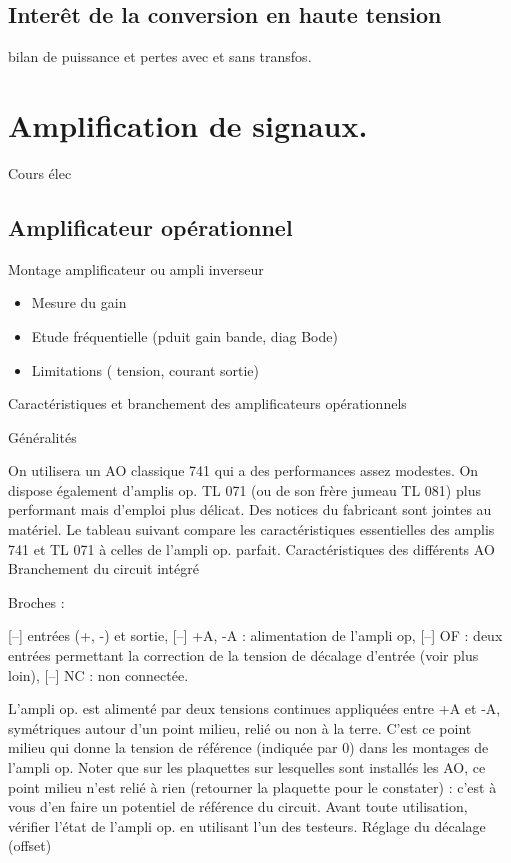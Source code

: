 \documentclass{article}%
\begin{document}
\subsection{Interêt de la conversion en haute tension}
bilan de puissance et pertes avec et sans transfos.

\section{Amplification de signaux.}

Cours élec

\subsection{Amplificateur opérationnel}
Montage amplificateur ou ampli inverseur

\begin{itemize}
\item Mesure du gain
\item Etude fréquentielle (pduit gain bande, diag Bode)
\item Limitations ( tension, courant sortie)
\end{itemize}

 Caractéristiques et branchement des amplificateurs opérationnels

 Généralités

On utilisera un AO classique 741 qui a des performances assez modestes. On dispose également d'amplis op. TL 071 (ou de son frère jumeau TL 081) plus performant mais d'emploi plus délicat. Des notices du fabricant sont jointes au matériel. Le tableau suivant compare les caractéristiques essentielles des amplis 741 et TL 071 à celles de l'ampli op. parfait.
Caractéristiques des différents AO
Branchement du circuit intégré

Broches :

    [--] entrées (+, -) et sortie,
    [--] +A, -A : alimentation de l'ampli op,
    [--] OF : deux entrées permettant la correction de la tension de décalage d'entrée (voir plus loin),
    [--] NC : non connectée.

L'ampli op. est alimenté par deux tensions continues appliquées entre +A et -A, symétriques autour d'un point milieu, relié ou non à la terre. C'est ce point milieu qui donne la tension de référence (indiquée par 0) dans les montages de l'ampli op. Noter que sur les plaquettes sur lesquelles sont installés les AO, ce point milieu n'est relié à rien (retourner la plaquette pour le constater) : c'est à vous d'en faire un potentiel de référence du circuit. Avant toute utilisation, vérifier l'état de l'ampli op. en utilisant l'un des testeurs.
Réglage du décalage (offset)
\end{document}
